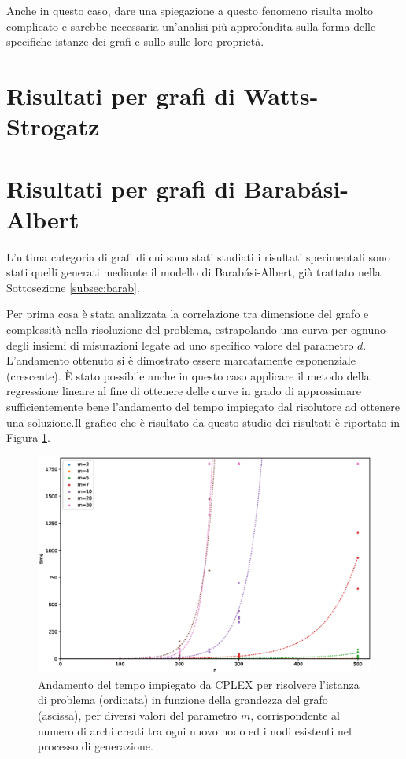 Anche in questo caso, dare una spiegazione a questo fenomeno risulta molto complicato e sarebbe necessaria un'analisi più approfondita sulla forma delle specifiche istanze dei grafi e sullo sulle loro proprietà.

\section{Risultati per grafi di Watts-Strogatz}

\newpage
\section{Risultati per grafi di Barabási-Albert}
L'ultima categoria di grafi di cui sono stati studiati i risultati sperimentali sono stati quelli generati mediante il modello di Barabási-Albert, già trattato nella Sottosezione \ref{subsec:barab}. 

Per prima cosa è stata analizzata la correlazione tra dimensione del grafo e complessità nella risoluzione del problema, estrapolando una curva per ognuno degli insiemi di misurazioni legate ad uno specifico valore del parametro $d$.  L'andamento ottenuto si è dimostrato essere marcatamente esponenziale (crescente). È stato possibile anche in questo caso applicare il metodo della regressione lineare al fine di ottenere delle curve in grado di approssimare sufficientemente bene l'andamento del tempo impiegato dal risolutore ad ottenere una soluzione.Il grafico che è risultato da questo studio dei risultati è riportato in Figura \ref{fig:bag1}.
\vspace{-0.5cm}  
\begin{figure}[h!]
     \centering
       \includegraphics[scale=0.5]{images/bag.eps}
       \vspace{-0.5cm}  
       \caption{Andamento del tempo impiegato da CPLEX per risolvere l'istanza di problema (ordinata) in funzione della grandezza del grafo (ascissa), per diversi valori del parametro $m$, corrispondente al numero di archi creati tra ogni nuovo nodo ed i nodi esistenti nel processo di generazione.}      
      
        \label{fig:bag1}
\end{figure}

